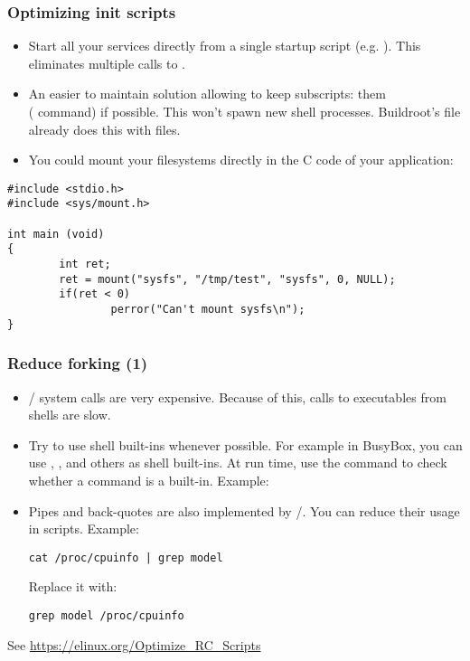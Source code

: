 \begin{frame}[fragile]
\frametitle{Optimizing init scripts}
\begin{itemize}
	\item Start all your services directly from a single startup
	      script (e.g. ). This eliminates multiple
	      calls to .
	\item An easier to maintain solution allowing to keep subscripts:  them\\
              ( command) if possible. This won't spawn new shell
              processes. Buildroot's  file already
              does this with  files.
	\item You could mount your filesystems directly in the C code
	      of your application:
\end{itemize}
\begin{block}{}
\begin{verbatim}
#include <stdio.h>
#include <sys/mount.h>

int main (void)
{
        int ret;
        ret = mount("sysfs", "/tmp/test", "sysfs", 0, NULL);
        if(ret < 0)
                perror("Can't mount sysfs\n");
}
\end{verbatim}
\end{block}
\end{frame}

\begin{frame}[fragile]
\frametitle{Reduce forking (1)}
\begin{itemize}
\item {}/ system calls are very expensive.
      Because of this, calls to executables from shells are slow.
\item Try to use shell built-ins whenever possible. For example in
      BusyBox, you can use , , 
      and others as shell built-ins. At run time, use the 
      command to check whether a command is a built-in. Example:
\item Pipes and back-quotes are also implemented by
      /.  You can reduce their usage in
      scripts. Example:
      \begin{block}{}
      \begin{verbatim}
cat /proc/cpuinfo | grep model
      \end{verbatim}
      \end{block}
Replace it with:
      \begin{block}{}
      \begin{verbatim}
grep model /proc/cpuinfo
      \end{verbatim}
      \end{block}
\end{itemize}
See \url{https://elinux.org/Optimize_RC_Scripts}
\end{frame}

